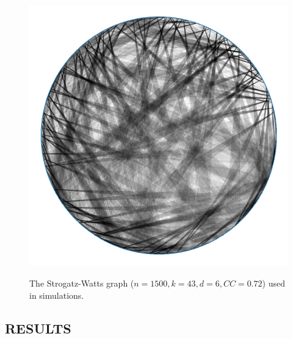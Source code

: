 \documentclass[fullpage]{extarticle}
\begin{document}
\begin{figure}[b!]
\begin{center}
	\label{fig1}
	\includegraphics[width=\textwidth]{figures/ws/graph}
	\caption{The Strogatz-Watts graph ($n = 1500, k = 43, d = 6, CC = 0.72$) used in simulations.}
\end{center}
\end{figure}

\break

\begin{center}
\section{RESULTS}
\label{sec:3}
\end{center}
\end{document}
